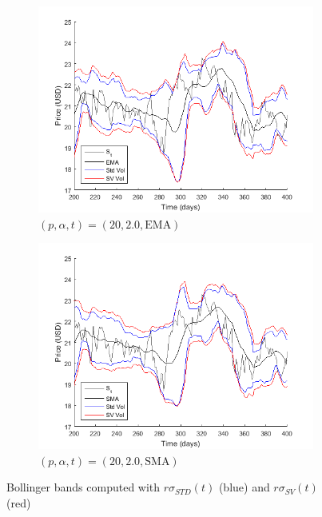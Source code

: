 \documentclass[11pt,a4,twosided,singlespacing,titlepagenumber=on]{scrreprt}
\numberwithin{equation}{chapter} %
\theoremstyle{remark}
\begin{document}
\begin{figure}[H]
    \centering
    \begin{subfigure}[t]{0.49\textwidth}
        \centering
        \includegraphics[width=1\textwidth]{model_vol/6}
        \caption{$(p, \alpha, t) = (20, 2.0,\text{EMA})$}
        \label{vol_mod_ema}
    \end{subfigure}
    \begin{subfigure}[t]{0.49\textwidth}
        \centering
        \includegraphics[width=1\textwidth]{model_vol/7}
        \caption{$(p, \alpha, t) = (20, 2.0,\text{SMA})$}
        \label{vol_mod_sma}
    \end{subfigure}
    \caption{Bollinger bands computed with $r\sigma_{STD}(t)$ (blue) and $r\sigma_{SV}(t)$ (red)}
    \label{fig:bollinger_bands_sma_ema}
\end{figure}
\end{document}
